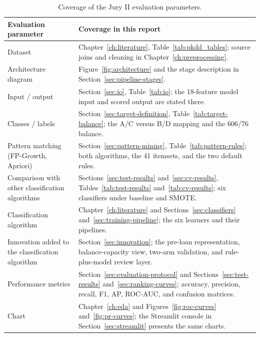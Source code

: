 \begin{table}[htbp]
    \centering
    \small
    \renewcommand{\arraystretch}{1.2}
    \begin{tabularx}{\textwidth}{@{}>{\raggedright\arraybackslash}p{4.4cm}X@{}}
        \toprule
        \textbf{Evaluation parameter} & \textbf{Coverage in this report} \\
        \midrule
        Dataset & Chapter~\ref{ch:literature}, Table~\ref{tab:pkdd_tables}; source joins and cleaning in Chapter~\ref{ch:preprocessing}. \\
        \addlinespace
        Architecture diagram & Figure~\ref{fig:architecture} and the stage description in Section~\ref{sec:pipeline-stages}. \\
        \addlinespace
        Input / output & Section~\ref{sec:io}, Table~\ref{tab:io}; the 18-feature model input and scored output are stated there. \\
        \addlinespace
        Classes / labels & Section~\ref{sec:target-definition}, Table~\ref{tab:target-balance}; the A/C versus B/D mapping and the 606/76 balance. \\
        \addlinespace
        Pattern matching (FP-Growth, Apriori) & Section~\ref{sec:pattern-mining}, Table~\ref{tab:pattern-rules}; both algorithms, the 41 itemsets, and the two default rules. \\
        \addlinespace
        Comparison with other classification algorithms & Sections~\ref{sec:test-results} and~\ref{sec:cv-results}, Tables~\ref{tab:test-results} and~\ref{tab:cv-results}; six classifiers under baseline and SMOTE. \\
        \addlinespace
        Classification algorithm & Chapter~\ref{ch:literature} and Sections~\ref{sec:classifiers} and~\ref{sec:training-pipeline}; the six learners and their pipelines. \\
        \addlinespace
        Innovation added to the classification algorithm & Section~\ref{sec:innovation}; the pre-loan representation, balance-capacity view, two-arm validation, and rule-plus-model review layer. \\
        \addlinespace
        Performance metrics & Section~\ref{sec:evaluation-protocol} and Sections~\ref{sec:test-results} and~\ref{sec:ranking-curves}; accuracy, precision, recall, F1, AP, ROC-AUC, and confusion matrices. \\
        \addlinespace
        Chart & Chapter~\ref{ch:eda} and Figures~\ref{fig:roc-curves} and~\ref{fig:pr-curves}; the Streamlit console in Section~\ref{sec:streamlit} presents the same charts. \\
        \bottomrule
    \end{tabularx}
    \caption{Coverage of the Jury II evaluation parameters.}
    \label{tab:jury2-coverage}
\end{table}

